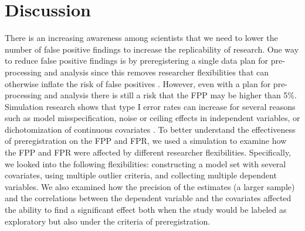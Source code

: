 \section{Discussion}
There is an increasing awareness among scientists that we need to  lower the number of false positive findings to increase the replicability of research. One way to reduce false positive findings is by preregistering a single data plan for pre-processing and analysis since this removes researcher flexibilities that can otherwise inflate the risk of false positives \citep{Simmons2011}. However, even with a plan for pre-processing and analysis there is still a risk that the FPP may be higher than 5\%. Simulation research shows that type I error rates can increase for several reasons such as model misspecification, noise or ceiling effects in independent variables, or dichotomization of continuous covariates \citep{Dennis2019, Litiere2007, Brunner2009, Austin2003, Austin2004}. To better understand the effectiveness of preregistration on the FPP and FPR, we used a simulation to examine how the FPP and FPR were affected by different researcher flexibilities. Specifically, we looked into the following flexibilities: constructing a model set with several covariates, using multiple outlier criteria, and collecting multiple dependent variables. We also examined how the precision of the estimates (a larger sample) and the correlations between the dependent variable and the covariates affected the ability to find a significant effect both when the study would be labeled as exploratory but also under the criteria of preregistration. \\

